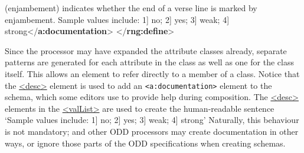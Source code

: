 \begin{shaded}
\mbox{}\newline 
\hspace*{1em}\mbox{}\newline 
\hspace*{1em}\hspace*{1em}(enjambement) indicates whether the end of a verse line is marked by\mbox{}\newline 
\hspace*{1em}\hspace*{1em}\hspace*{1em}\hspace*{1em}\hspace*{1em}\hspace*{1em} enjambement. Sample values include: 1] no; 2] yes; 3] weak; 4]\mbox{}\newline 
\hspace*{1em}\hspace*{1em}\hspace*{1em}\hspace*{1em}\hspace*{1em}\hspace*{1em} strong{</\textbf{a:documentation}>}\mbox{}\newline 
\hspace*{1em}\hspace*{1em}\mbox{}\newline 
\hspace*{1em}\mbox{}\newline 
{}\mbox{}\newline 
{</\textbf{rng:define}>}\end{shaded}\egroup\par \noindent  Since the processor may have expanded the attribute classes already, separate patterns are generated for each attribute in the class as well as one for the class itself. This allows an element to refer directly to a member of a class. Notice that the \hyperref[TEI.desc]{<desc>} element is used to add an \texttt{<a:documentation>} element to the schema, which some editors use to provide help during composition. The \hyperref[TEI.desc]{<desc>} elements in the \hyperref[TEI.valList]{<valList>} are used to create the human-readable sentence ‘Sample values include: 1] no; 2] yes; 3] weak; 4] strong’ Naturally, this behaviour is not mandatory; and other ODD processors may create documentation in other ways, or ignore those parts of the ODD specifications when creating schemas.\par
